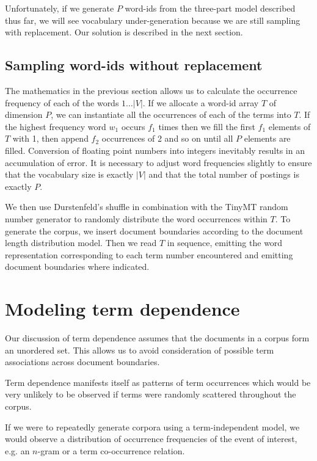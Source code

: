 \documentclass[11pt]{report}
\begin{document}
Unfortunately, if we generate $P$ word-ids from the three-part model
described thus far, we will see vocabulary under-generation
because we are still sampling with replacement.  Our solution is described
in the next section.

\section{Sampling word-ids without replacement}

\label{Sec:withoutRep}
The mathematics in the previous section allows us to calculate the
occurrence frequency of each of the words $1 \ldots |V|$.  If we
allocate a word-id array $T$ of dimension $P$, we can instantiate all the
occurrences of each of the terms into $T$.  If the highest frequency word $w_1$ occurs $f_1$
times then we fill the first $f_1$ elements of $T$ with 1, then append
$f_2$ occurrences of 2 and so on until all $P$ elements are filled.
Conversion of floating point numbers into integers inevitably results in an
accumulation of error.  It is necessary to adjust word
frequencies slightly to ensure that the vocabulary size is exactly
$|V|$ and that the total number of postings is exactly $P$.

We then use Durstenfeld's shuffle in combination with the TinyMT
random number generator to randomly distribute the word occurrences
within $T$. To generate the corpus, we insert document boundaries according to the
document length distribution model.  Then we read $T$ in sequence,
emitting the word representation corresponding to each term number
encountered and emitting document boundaries where indicated.


\chapter{Modeling term dependence}    %
\label{TDepMod}

Our discussion of term dependence assumes that the documents in a
corpus form an unordered set.   This allows us to avoid consideration
of possible term associations across document boundaries.

Term dependence manifests itself as patterns of term occurrences which
would be very unlikely to be observed if terms were randomly scattered
throughout the corpus.

If we were to repeatedly generate corpora using a term-independent
model, we would observe a distribution of occurrence frequencies of
the event of interest, e.g.  an $n$-gram or a term co-occurrence
relation.
\end{document}
